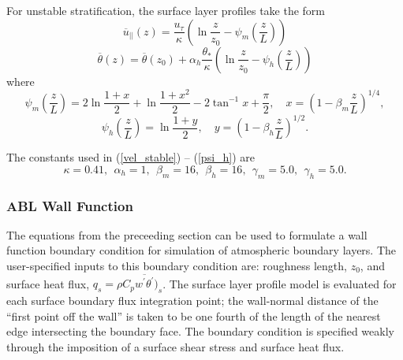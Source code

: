 For unstable stratification, the surface layer profiles take the form
\begin{equation} \label{vel_unstable}
  \overline{u}_{||}(z) = \frac{u_\tau}{\kappa}\left(\ln\frac{z}{z_0} -
  \psi_m\left(\frac{z}{L}\right)\right)
\end{equation}
\begin{equation} \label{temp_unstable}
  \overline{\theta}(z) = \overline{\theta}(z_0) +
  \alpha_h\frac{\theta_*}{\kappa}\left(\ln\frac{z}{z_0} -
  \psi_h\left(\frac{z}{L}\right)\right)
\end{equation}
where
\begin{equation} \label{psi_m}
 \psi_m\left(\frac{z}{L}\right) = 2\ln\frac{1 + x}{2} + \ln\frac{1 + x^2}{2} - 2\tan^{-1}x +
 \frac{\pi}{2}, \quad x = \left(1 - \beta_m\frac{z}{L}\right)^{1/4},
\end{equation}
\begin{equation} \label{psi_h}
 \psi_h\left(\frac{z}{L}\right) = \ln\frac{1 + y}{2}, \quad y = \left(1 -
 \beta_h\frac{z}{L}\right)^{1/2}.
\end{equation}

The constants used in (\ref{vel_stable}) -- (\ref{psi_h}) are \cite{Dyer:74}
\begin{equation}
  \kappa = 0.41,~~\alpha_h =
  1,~~\beta_m=16,~~\beta_h=16,~~\gamma_m=5.0,~~\gamma_h=5.0.
\end{equation}

\subsubsection{ABL Wall Function}
The equations from the preceeding section can be used to formulate a
wall function boundary condition for simulation of atmospheric
boundary layers.  The user-specified inputs to this boundary condition
are: roughness length, $z_0$, and surface heat flux, $q_s =
\rho C_p \overline{w^\prime \theta^\prime})_s$.  The surface layer profile
model is evaluated for each surface boundary flux integration point;
the wall-normal distance of the ``first point off the wall'' is taken
to be one fourth of the length of the nearest edge intersecting the
boundary face.  The boundary condition is specified weakly through the
imposition of a surface shear stress and surface heat flux.


